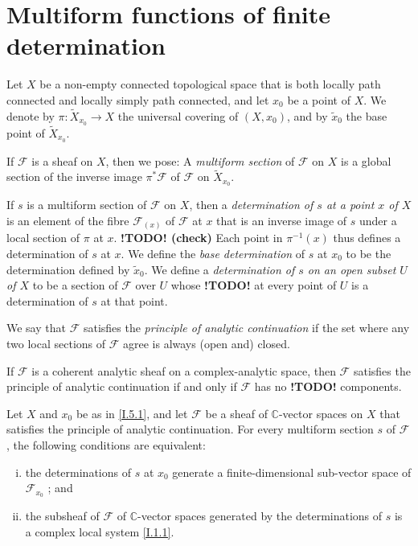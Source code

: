 \documentclass{report}
\theoremstyle{plain}
\newenvironment{proposition}[1]
    {\renewcommand\theinnercustomproposition{#1}\innercustomproposition}
    {\endinnercustomproposition}
\theoremstyle{definition}
\newenvironment{definition}[1]
    {\renewcommand\theinnercustomdefinition{#1}\innercustomdefinition}
    {\endinnercustomdefinition}
\newenvironment{example}[1]
    {\renewcommand\theinnercustomexample{#1}\innercustomexample}
    {\endinnercustomexample}
\newenvironment{env}[1]
    {\renewcommand\theinnercustomenv{#1}\innercustomenv}
    {\endinnercustomenv}
\newcommand{\sh}[1]{{\mathscr{#1}}}
\newcommand{\CC}{\mathbb{C}}
\newcommand{\todo}{\textbf{ !TODO! }}
\newcommand{\oldpage}[1]{\marginpar{\footnotesize$\Big\vert$ \textit{p.~#1}}}
\begin{document}
\oldpage{37}
\section{Multiform functions of finite determination}
\label{I.6}

\begin{env}{6.1}
\label{I.6.1}
  Let $X$ be a non-empty connected topological space that is both locally path connected and locally simply path connected, and let $x_0$ be a point of $X$.
  We denote by $\pi\colon \widetilde{X}_{x_0}\to X$ the universal covering of $(X,x_0)$, and by $\widetilde{x}_0$ the base point of $\widetilde{X}_{x_0}$.
\end{env}

If $\sh{F}$ is a sheaf on $X$, then we pose:
\begin{definition}{6.2}
\label{I.6.2}
  A \emph{multiform section} of $\sh{F}$ on $X$ is a global section of the inverse image $\pi^*\sh{F}$ of $\sh{F}$ on $\widetilde{X}_{x_0}$.

  If $s$ is a multiform section of $\sh{F}$ on $X$, then a \emph{determination of $s$ at a point $x$ of $X$} is an element of the fibre $\sh{F}_{(x)}$ of $\sh{F}$ at $x$ that is an inverse image of $s$ under a local section of $\pi$ at $x$.
  \textbf{\todo (check)}
  Each point in $\pi^{-1}(x)$ thus defines a determination of $s$ at $x$.
  We define the \emph{base determination} of $s$ at $x_0$ to be the determination defined by $\widetilde{x}_0$.
  We define a \emph{determination of $s$ on an open subset $U$ of $X$} to be a section of $\sh{F}$ over $U$ whose \todo at every point of $U$ is a determination of $s$ at that point.
\end{definition}

\begin{definition}{6.3}
\label{I.6.3}
  We say that $\sh{F}$ satisfies the \emph{principle of analytic continuation} if the set where any two local sections of $\sh{F}$ agree is always (open and) closed.
\end{definition}

\begin{example}{6.4}
\label{I.6.4}
  If $\sh{F}$ is a coherent analytic sheaf on a complex-analytic space, then $\sh{F}$ satisfies the principle of analytic continuation if and only if $\sh{F}$ has no \todo components.
\end{example}

\begin{proposition}{6.5}
\label{I.6.5}
  Let $X$ and $x_0$ be as in \cref{I.5.1}, and let $\sh{F}$ be a sheaf of $\CC$-vector spaces on $X$ that satisfies the principle of analytic continuation.
  For every multiform section $s$ of $\sh{F}$, the following conditions are equivalent:
  \begin{enumerate}[(i)]
    \item the determinations of $s$ at $x_0$ generate a finite-dimensional sub-vector space of $\sh{F}_{x_0}$ ; and
    \item the subsheaf of $\sh{F}$ of $\CC$-vector spaces generated by the determinations of $s$ is a complex local system \cref{I.1.1}.
  \end{enumerate}
\end{proposition}
\end{document}
